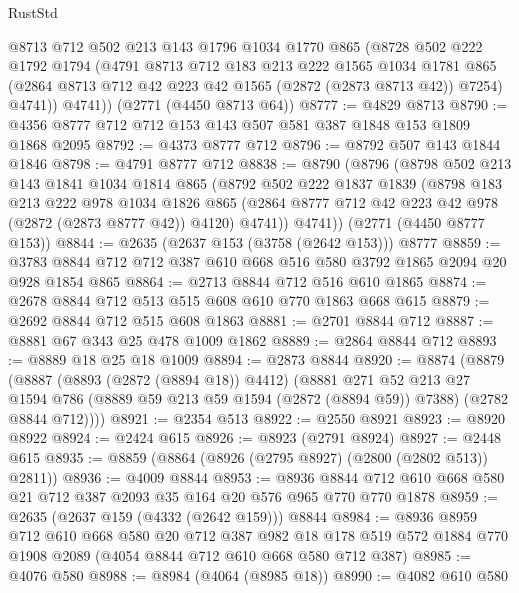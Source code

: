 \begin{lexlean}{RustStd}
\begin{coremodule}
        @8713
        @712
        @502
        @213
        @143
        @1796
        @1034
        @1770
        @865
        (@8728
          @502
          @222
          @1792
          @1794
          (@4791
            @8713
            @712
            @183
            @213
            @222
            @1565
            @1034
            @1781
            @865
            (@2864 @8713 @712 @42 @223 @42 @1565 (@2872 (@2873 @8713 @42)) @7254)
            @4741))
        @4741))
    (@2771 (@4450 @8713 @64))
@8777 := @4829 @8713
@8790 := @4356 @8777 @712 @712 @153 @143 @507 @581 @387 @1848 @153 @1809 @1868 @2095
@8792 := @4373 @8777 @712
@8796 := @8792 @507 @143 @1844 @1846
@8798 := @4791 @8777 @712
@8838 := @8790
    (@8796
      (@8798
        @502
        @213
        @143
        @1841
        @1034
        @1814
        @865
        (@8792
          @502
          @222
          @1837
          @1839
          (@8798
            @183
            @213
            @222
            @978
            @1034
            @1826
            @865
            (@2864 @8777 @712 @42 @223 @42 @978 (@2872 (@2873 @8777 @42)) @4120)
            @4741))
        @4741))
    (@2771 (@4450 @8777 @153))
@8844 := @2635 (@2637 @153 (@3758 (@2642 @153))) @8777
@8859 := @3783 @8844 @712 @712 @387 @610 @668 @516 @580 @3792 @1865 @2094 @20 @928 @1854 @865
@8864 := @2713 @8844 @712 @516 @610 @1865
@8874 := @2678 @8844 @712 @513 @515 @608 @610 @770 @1863 @668 @615
@8879 := @2692 @8844 @712 @515 @608 @1863
@8881 := @2701 @8844 @712
@8887 := @8881 @67 @343 @25 @478 @1009 @1862
@8889 := @2864 @8844 @712
@8893 := @8889 @18 @25 @18 @1009
@8894 := @2873 @8844
@8920 := @8874
    (@8879
      (@8887
        (@8893 (@2872 (@8894 @18)) @4412)
        (@8881
          @271
          @52
          @213
          @27
          @1594
          @786
          (@8889 @59 @213 @59 @1594 (@2872 (@8894 @59)) @7388)
          (@2782 @8844 @712))))
@8921 := @2354 @513
@8922 := @2550 @8921
@8923 := @8920 @8922
@8924 := @2424 @615
@8926 := @8923 (@2791 @8924)
@8927 := @2448 @615
@8935 := @8859 (@8864 (@8926 (@2795 @8927) (@2800 (@2802 @513)) @2811))
@8936 := @4009 @8844
@8953 := @8936 @8844 @712 @610 @668 @580 @21 @712 @387 @2093 @35 @164 @20 @576 @965 @770 @770 @1878
@8959 := @2635 (@2637 @159 (@4332 (@2642 @159))) @8844
@8984 := @8936
    @8959
    @712
    @610
    @668
    @580
    @20
    @712
    @387
    @982
    @18
    @178
    @519
    @572
    @1884
    @770
    @1908
    @2089
    (@4054 @8844 @712 @610 @668 @580 @712 @387)
@8985 := @4076 @580
@8988 := @8984 (@4064 (@8985 @18))
@8990 := @4082 @610 @580

\end{coremodule}
\end{lexlean}
